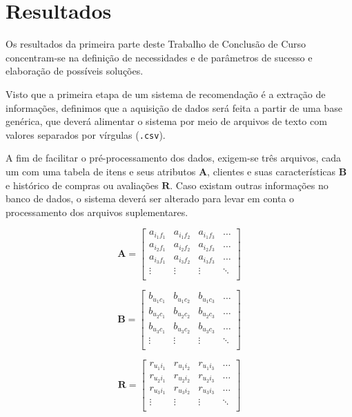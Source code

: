 \chapter[Resultados]{Resultados}
\label{chap:resultados}

Os resultados da primeira parte deste Trabalho de Conclusão de Curso concentram-se na definição de necessidades e de parâmetros de sucesso e elaboração de possíveis soluções.

Visto que a primeira etapa de um sistema de recomendação é a extração de informações, definimos que a aquisição de dados será feita a partir de uma base genérica, que deverá alimentar o sistema por meio de arquivos de texto com valores separados por vírgulas (\texttt{.csv}). 

A fim de facilitar o pré-processamento dos dados, exigem-se três arquivos, cada um com uma tabela de itens e seus atributos $\mathbf{A}$, clientes e suas características $\mathbf{B}$ e histórico de compras ou avaliações $\mathbf{R}$. Caso existam outras informações no banco de dados, o sistema deverá ser alterado para levar em conta o processamento dos arquivos suplementares.

\begin{equation} 
\mathbf{A} = 
\begin{bmatrix} 
 a_{i_1 f_1} &  a_{i_1 f_2} &  a_{i_1 f_3}  & \dots   \\
 a_{i_2 f_1} &  a_{i_2 f_2} &  a_{i_2 f_3}  & \dots   \\
 a_{i_3 f_1} &  a_{i_3 f_2} &  a_{i_3 f_3}  & \dots  \\ 
 \vdots &  \vdots &  \vdots  & \ddots   \\
 \end{bmatrix}
\end{equation}

\begin{equation}
	\mathbf{B} = 
\begin{bmatrix} 
 b_{u_1 c_1} &  b_{u_1 c_2} &  b_{u_1 c_3}  & \dots   \\
 b_{u_2 c_1} &  b_{u_2 c_2} &  b_{u_2 c_3}  & \dots   \\
 b_{u_3 c_1} &  b_{u_3 c_2} &  b_{u_3 c_3}  & \dots  \\ 
 \vdots &  \vdots &  \vdots  & \ddots   \\
 \end{bmatrix}
\end{equation}

\begin{equation}
	  \mathbf{R} = 
\begin{bmatrix} 
  r_{u_1 i_1} &  r_{u_1 i_2} &  r_{u_1 i_3}  & \dots   \\
 r_{u_2 i_1} &  r_{u_2 i_2} &  r_{u_2 i_3}  & \dots   \\
 r_{u_3 i_1} &  r_{u_3 i_2} &  r_{u_3 i_3}  & \dots  \\ 
 \vdots &  \vdots &  \vdots  & \ddots   \\
\end{bmatrix}
\end{equation}

